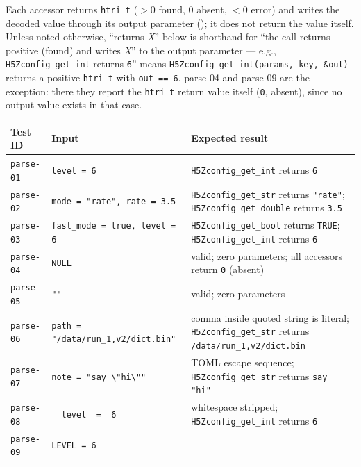 \documentclass[../RFC-HDFG-2026-001.tex]{subfiles}
\begin{document}

Each accessor returns \texttt{htri\_t} ($>0$ found, $0$ absent, $<0$ error)
and writes the decoded value through its output parameter
(); it does not return the value itself.
Unless noted otherwise, ``returns \emph{X}'' below is shorthand for ``the
call returns positive (found) and writes \emph{X}'' to the output
parameter --- e.g., \texttt{H5Zconfig\_get\_int} returns \texttt{6}'' means
\texttt{H5Zconfig\_get\_int(params, key, \&out)} returns a positive
\texttt{htri\_t} with \texttt{out~==~6}.  parse-04 and parse-09 are the
exception: there they report the \texttt{htri\_t} return value itself
(\texttt{0}, absent), since no output value exists in that case.

\begin{center}
\small
\renewcommand{\arraystretch}{1.25}
\begin{tabularx}{\textwidth}{l>{\raggedright\arraybackslash\hsize=0.7\hsize}X>{\raggedright\arraybackslash\hsize=1.3\hsize}X}
\toprule
\textbf{Test ID} & \textbf{Input} & \textbf{Expected result} \\
\midrule
\texttt{parse-01} & \texttt{level = 6}
  & \texttt{H5Zconfig\_get\_int} returns \texttt{6} \\
\texttt{parse-02} & \texttt{mode = "rate", rate = 3.5}
  & \texttt{H5Zconfig\_get\_str} returns \texttt{"rate"}; \texttt{H5Zconfig\_get\_double} returns \texttt{3.5} \\
\texttt{parse-03} & \texttt{fast\_mode = true, level = 6}
  & \texttt{H5Zconfig\_get\_bool} returns \texttt{TRUE}; \texttt{H5Zconfig\_get\_int} returns \texttt{6} \\
\texttt{parse-04} & \texttt{NULL}
  & valid; zero parameters; all accessors return \texttt{0} (absent) \\
\texttt{parse-05} & \texttt{""}
  & valid; zero parameters \\
\texttt{parse-06} & \texttt{path = "/data/run\_1,v2/dict.bin"}
  & comma inside quoted string is literal; \texttt{H5Zconfig\_get\_str} returns \texttt{/data/run\_1,v2/dict.bin} \\
\texttt{parse-07} & \texttt{note = "say \textbackslash"hi\textbackslash""}
  & TOML escape sequence; \texttt{H5Zconfig\_get\_str} returns \texttt{say "hi"} \\
\texttt{parse-08} & \texttt{\ \ level\ \ =\ \ 6\ \ }
  & whitespace stripped; \texttt{H5Zconfig\_get\_int} returns \texttt{6} \\
\texttt{parse-09} & \texttt{LEVEL = 6}

\end{tabularx}
\end{center}
\end{document}
